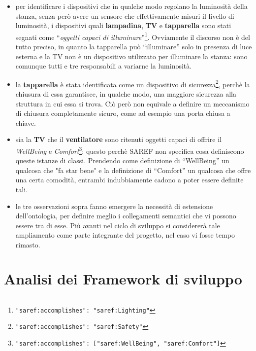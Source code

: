 \documentclass[12pt,a4paper,openright,oneside]{report}
\newcommand{\quotes}[1]{``#1''}
\begin{document}
\begin{itemize}
	\item per identificare i dispositivi che in qualche modo regolano la luminosità della stanza, senza però avere un sensore che effettivamente misuri il livello di luminosità, i dispositivi quali \textbf{lampadina}, \textbf{TV} e \textbf{tapparella} sono stati segnati come \quotes{\textit{oggetti capaci di illuminare}}\footnote{\texttt{"saref:accomplishes": "saref:Lighting"}}. Ovviamente il discorso non è del tutto preciso, in quanto la tapparella può \quotes{illuminare} solo in presenza di luce esterna e la TV non è un dispositivo utilizzato per illuminare la stanza: sono comunque tutti e tre responsabili a variarne la luminosità.
	
	\item la \textbf{tapparella} è stata identificata come un dispositivo di sicurezza\footnote{\texttt{"saref:accomplishes": "saref:Safety"}}, perchè la chiusura di essa garantisce, in qualche modo, una maggiore sicurezza alla struttura in cui essa si trova. Ciò però non equivale a definire un meccanismo di chiusura completamente sicuro, come ad esempio una porta chiusa a chiave. 
	
	\item sia la \textbf{TV} che il \textbf{ventilatore} sono ritenuti oggetti capaci di offrire il \textit{WellBeing} e \textit{Comfort}\footnote{\texttt{"saref:accomplishes": ["saref:WellBeing", "saref:Comfort"]}}: questo perchè SAREF non specifica cosa definiscono queste istanze di classi. Prendendo come definizione di \quotes{WellBeing} un qualcosa che "fa star bene" e la definizione di \quotes{Comfort} un qualcosa che offre una certa comodità, entrambi indubbiamente cadono a poter essere definite tali.
	
	\item le tre osservazioni sopra fanno emergere la necessità di estensione dell'ontologia, per definire meglio i collegamenti semantici che vi possono essere tra di esse. Più avanti nel ciclo di sviluppo si considererà tale ampliamento come parte integrante del progetto, nel caso vi fosse tempo rimasto.
\end{itemize}


\clearpage{\pagestyle{empty}\cleardoublepage}
\chapter{Analisi dei Framework di sviluppo}           %
\lhead[\fancyplain{}{\bfseries\thepage}]{\fancyplain{}{\bfseries\rightmark}}  
\end{document}

